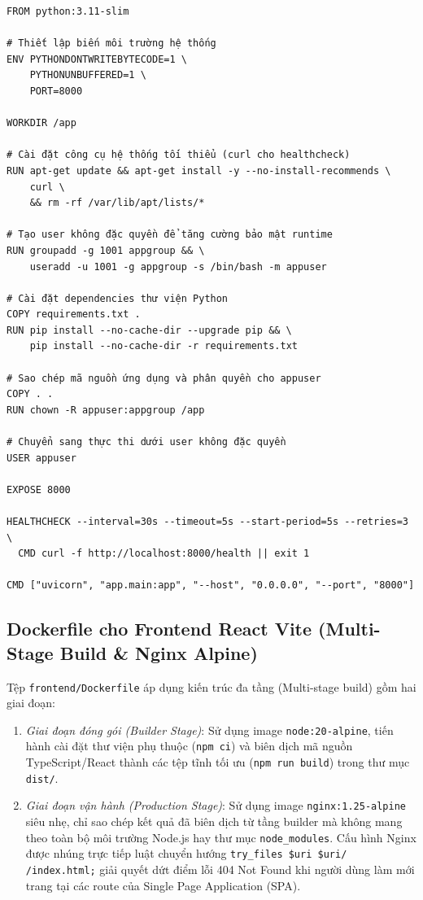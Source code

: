 \begin{footnotesize}
\begin{verbatim}
FROM python:3.11-slim

# Thiết lập biến môi trường hệ thống
ENV PYTHONDONTWRITEBYTECODE=1 \
    PYTHONUNBUFFERED=1 \
    PORT=8000

WORKDIR /app

# Cài đặt công cụ hệ thống tối thiểu (curl cho healthcheck)
RUN apt-get update && apt-get install -y --no-install-recommends \
    curl \
    && rm -rf /var/lib/apt/lists/*

# Tạo user không đặc quyền để tăng cường bảo mật runtime
RUN groupadd -g 1001 appgroup && \
    useradd -u 1001 -g appgroup -s /bin/bash -m appuser

# Cài đặt dependencies thư viện Python
COPY requirements.txt .
RUN pip install --no-cache-dir --upgrade pip && \
    pip install --no-cache-dir -r requirements.txt

# Sao chép mã nguồn ứng dụng và phân quyền cho appuser
COPY . .
RUN chown -R appuser:appgroup /app

# Chuyển sang thực thi dưới user không đặc quyền
USER appuser

EXPOSE 8000

HEALTHCHECK --interval=30s --timeout=5s --start-period=5s --retries=3 \
  CMD curl -f http://localhost:8000/health || exit 1

CMD ["uvicorn", "app.main:app", "--host", "0.0.0.0", "--port", "8000"]
\end{verbatim}
\end{footnotesize}

\subsection{Dockerfile cho Frontend React Vite (Multi-Stage Build \& Nginx Alpine)}\label{subsec:v8-docker-frontend}

Tệp \texttt{frontend/Dockerfile} áp dụng kiến trúc đa tầng (Multi-stage build) gồm hai giai đoạn:
\begin{enumerate}[label=\alph*)]
    \item \textit{Giai đoạn đóng gói (Builder Stage)}: Sử dụng image \texttt{node:20-alpine}, tiến hành cài đặt thư viện phụ thuộc (\texttt{npm ci}) và biên dịch mã nguồn TypeScript/React thành các tệp tĩnh tối ưu (\texttt{npm run build}) trong thư mục \texttt{dist/}.
    \item \textit{Giai đoạn vận hành (Production Stage)}: Sử dụng image \texttt{nginx:1.25-alpine} siêu nhẹ, chỉ sao chép kết quả đã biên dịch từ tầng builder mà không mang theo toàn bộ môi trường Node.js hay thư mục \texttt{node\_modules}. Cấu hình Nginx được nhúng trực tiếp luật chuyển hướng \texttt{try\_files \$uri \$uri/ /index.html;} giải quyết dứt điểm lỗi 404 Not Found khi người dùng làm mới trang tại các route của Single Page Application (SPA).
\end{enumerate}

